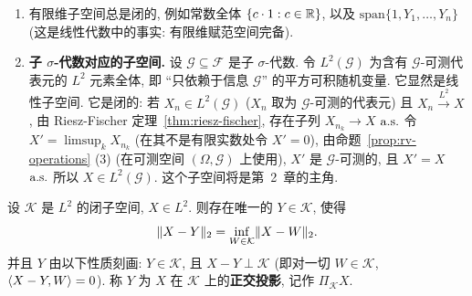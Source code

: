 \begin{example}\label{ex:closed-subspaces}
\begin{enumerate}
\item 有限维子空间总是闭的, 例如常数全体 $\{c\cdot1: c\in\mathbb{R}\}$, 以及 $\mathrm{span}\{1,Y_1,\dots,Y_n\}$ (这是线性代数中的事实: 有限维赋范空间完备).
\item \textbf{子 $\sigma$-代数对应的子空间.} 设 $\mathcal{G}\subseteq\mathcal{F}$ 是子 $\sigma$-代数. 令 $L^2(\mathcal{G})$ 为含有 $\mathcal{G}$-可测代表元的 $L^2$ 元素全体, 即 ``只依赖于信息 $\mathcal{G}$'' 的平方可积随机变量. 它显然是线性子空间. 它是闭的: 若 $X_n\in L^2(\mathcal{G})$ ($X_n$ 取为 $\mathcal{G}$-可测的代表元) 且 $X_n\xrightarrow{L^2}X$, 由 Riesz-Fischer 定理~\ref{thm:riesz-fischer}, 存在子列 $X_{n_k}\to X$ $\text{a.s.}$ 令 $X'=\limsup_kX_{n_k}$ (在其不是有限实数处令 $X'=0$), 由命题~\ref{prop:rv-operations} (3) (在可测空间 $(\Omega,\mathcal{G})$ 上使用), $X'$ 是 $\mathcal{G}$-可测的, 且 $X'=X$ $\text{a.s.}$ 所以 $X\in L^2(\mathcal{G})$. 这个子空间将是第~2~章的主角.
\end{enumerate}
\end{example}

\begin{theorem}[正交投影定理]\label{thm:projection}
设 $\mathcal{K}$ 是 $L^2$ 的闭子空间, $X\in L^2$. 则存在唯一的 $Y\in\mathcal{K}$, 使得
\[
\lVert X-Y\rVert_2=\inf_{W\in\mathcal{K}}\lVert X-W\rVert_2.
\]
并且 $Y$ 由以下性质刻画: $Y\in\mathcal{K}$, 且 $X-Y\perp\mathcal{K}$ (即对一切 $W\in\mathcal{K}$, $\langle X-Y,W\rangle=0$). 称 $Y$ 为 $X$ 在 $\mathcal{K}$ 上的\textbf{正交投影}, 记作 $\Pi_{\mathcal{K}}X$.
\end{theorem}

